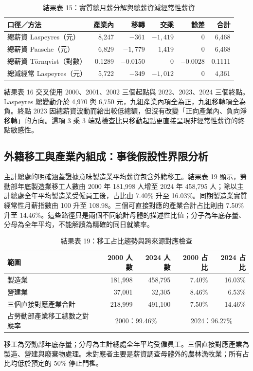 \documentclass[12pt]{article}
\newcommand{\MigrantShareStart}{7.40}
\newcommand{\MigrantShareEnd}{16.03}
\begin{document}
\begin{table}[htbp]
\caption{結果表 15：實質總月薪分解與總薪資減經常性薪資}
\centering\small
\begin{tabular}{lrrrrr}
\toprule
口徑／方法 & 產業內 & 移轉 & 交乘 & 餘差 & 合計\\
\midrule
總薪資 Laspeyres（元） & 8,247 & $-361$ & $-1,419$ & 0 & 6,468\\
總薪資 Paasche（元） & 6,829 & $-1,779$ & 1,419 & 0 & 6,468\\
總薪資 Törnqvist（對數） & 0.1289 & $-0.0150$ & 0 & $-0.0028$ & 0.1111\\
總減經常 Laspeyres（元） & 5,722 & $-349$ & $-1,012$ & 0 & 4,361\\
\bottomrule
\end{tabular}
\end{table}

結果表 16 交叉使用 2000、2001、2002 三個起點與 2022、2023、2024 三個終點。Laspeyres 總變動介於 4,970 與 6,750 元，九組產業內項全為正，九組移轉項全為負。終點 2023 因總薪資波動而給出較低總額，但沒有改變「正向產業內、負向淨移轉」的方向。這項 3 乘 3 端點檢查比只移動起點更直接呈現非經常性薪資的終點敏感性。

\subsection{外籍移工與產業內組成：事後假設性界限分析}

主計總處的明確涵蓋證據意味製造業平均薪資包含外籍移工。結果表 19 顯示，勞動部年底製造業移工人數由 2000 年 181,998 人增至 2024 年 458,795 人；除以主計總處全年平均製造業受僱員工後，占比由 \MigrantShareStart\% 升至 \MigrantShareEnd\%。同期製造業實質經常性月薪指數由 100 升至 108.98。三個可直接對應的產業合計占比則由 7.50\% 升至 14.46\%。這些路徑只是兩個不同統計母體的描述性比值；分子為年底存量、分母為全年平均，不能解讀為精確的同日就業率。

\begin{table}[htbp]
\caption{結果表 19：移工占比趨勢與跨來源對應檢查}
\centering\small
\begin{tabular}{lrrrr}
\toprule
範圍 & 2000 人數 & 2024 人數 & 2000 占比 & 2024 占比\\
\midrule
製造業 & 181,998 & 458,795 & 7.40\% & 16.03\%\\
營建業 & 37,001 & 32,305 & 8.46\% & 6.53\%\\
三個直接對應產業合計 & 218,999 & 491,100 & 7.50\% & 14.46\%\\
\midrule
占勞動部產業移工總數之對應率 & \multicolumn{2}{c}{2000：99.46\%} & \multicolumn{2}{c}{2024：96.27\%}\\
\bottomrule
\end{tabular}
\begin{tabnote}
移工為勞動部年底存量；分母為主計總處全年平均受僱員工。三個直接對應產業為製造、營建與廢棄物處理。未對應者主要是薪資調查母體外的農林漁牧業；所有占比均低於預定的 50\% 停止門檻。
\end{tabnote}
\end{table}
\end{document}
